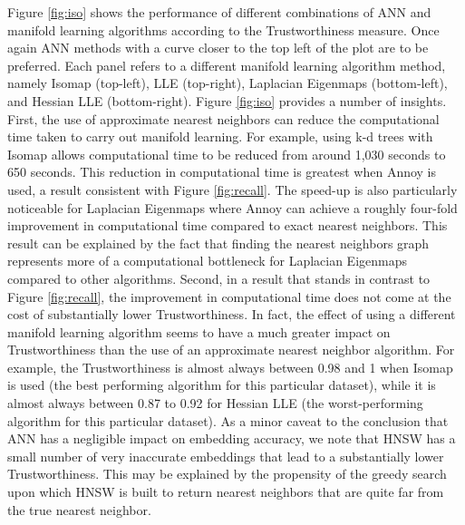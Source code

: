 \documentclass[11pt,a4paper,]{article}
\begin{document}
Figure \ref{fig:iso} shows the performance of different combinations of ANN and manifold learning algorithms according to the Trustworthiness measure. Once again ANN methods with a curve closer to the top left of the plot are to be preferred. Each panel refers to a different manifold learning algorithm method, namely Isomap (top-left), LLE (top-right), Laplacian Eigenmaps (bottom-left), and Hessian LLE (bottom-right). Figure \ref{fig:iso} provides a number of insights. First, the use of approximate nearest neighbors can reduce the computational time taken to carry out manifold learning. For example, using k-d trees with Isomap allows computational time to be reduced from around 1,030 seconds to 650 seconds. This reduction in computational time is greatest when Annoy is used, a result consistent with Figure \ref{fig:recall}. The speed-up is also particularly noticeable for Laplacian Eigenmaps where Annoy can achieve a roughly four-fold improvement in computational time compared to exact nearest neighbors. This result can be explained by the fact that finding the nearest neighbors graph represents more of a computational bottleneck for Laplacian Eigenmaps compared to other algorithms. Second, in a result that stands in contrast to Figure \ref{fig:recall}, the improvement in computational time does not come at the cost of substantially lower Trustworthiness. In fact, the effect of using a different manifold learning algorithm seems to have a much greater impact on Trustworthiness than the use of an approximate nearest neighbor algorithm. For example, the Trustworthiness is almost always between 0.98 and 1 when Isomap is used (the best performing algorithm for this particular dataset), while it is almost always between 0.87 to 0.92 for Hessian LLE (the worst-performing algorithm for this particular dataset). As a minor caveat to the conclusion that ANN has a negligible impact on embedding accuracy, we note that HNSW has a small number of very inaccurate embeddings that lead to a substantially lower Trustworthiness. This may be explained by the propensity of the greedy search upon which HNSW is built to return nearest neighbors that are quite far from the true nearest neighbor.
\end{document}
